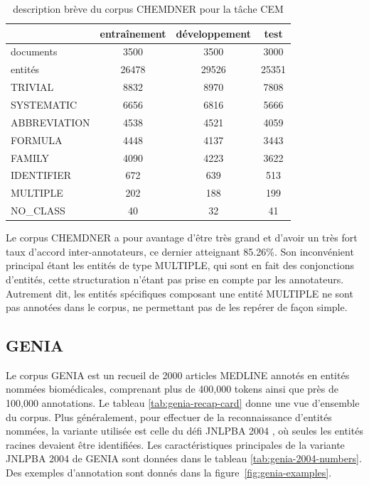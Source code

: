 \documentclass[12pt,a4paper,times,twoside,openright]{report}
\begin{document}
\begin{table}[ht!]
\centering
\begin{tabular}{|l|c|c|c|}
\cline{2-4}
\multicolumn{1}{c|}{} & entraînement & développement   & test   \\
\hline
documents             & 3500  & 3500  & 3000   \\
entités               & 26478 & 29526 & 25351  \\
\hline
TRIVIAL               & 8832  & 8970  & 7808   \\
SYSTEMATIC            & 6656  & 6816  & 5666   \\
ABBREVIATION          & 4538  & 4521  & 4059   \\
FORMULA               & 4448  & 4137  & 3443   \\
FAMILY                & 4090  & 4223  & 3622   \\
IDENTIFIER            & 672   & 639   & 513    \\
MULTIPLE              & 202   & 188   & 199    \\
NO\_CLASS             & 40    & 32    & 41     \\
\hline
\end{tabular}
\caption{description brève du corpus CHEMDNER pour la tâche CEM}
\label{tab:chemdner-splits-numbers}
\end{table}

Le corpus CHEMDNER a pour avantage d'être très grand et d'avoir un très fort taux d'accord inter-annotateurs, ce dernier atteignant 85.26\%. Son inconvénient principal étant les entités de type MULTIPLE, qui sont en fait des conjonctions d'entités, cette structuration n'étant pas prise en compte par les annotateurs. Autrement dit, les entités spécifiques composant une entité MULTIPLE ne sont pas annotées dans le corpus, ne permettant pas de les repérer de façon simple.


        
        \subsection{GENIA}
        \label{subsec:corpus-Genia}
Le corpus GENIA \citep{kim2003genia} est un recueil de 2000 articles MEDLINE annotés en entités nommées biomédicales, comprenant plus de 400,000 tokens ainsi que près de 100,000 annotations. Le tableau \ref{tab:genia-recap-card} donne une vue d'ensemble du corpus. Plus généralement, pour effectuer de la reconnaissance d'entités nommées, la variante utilisée est celle du défi JNLPBA 2004 \citep{kim2004introduction}, où seules les entités racines devaient être identifiées. Les caractéristiques principales de la variante JNLPBA 2004 de GENIA sont données dans le tableau \ref{tab:genia-2004-numbers}. Des exemples d'annotation sont donnés dans la figure\ \ref{fig:genia-examples}.
\end{document}
